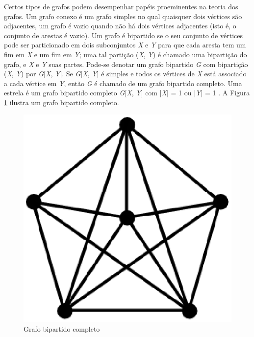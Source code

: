 Certos tipos de grafos podem desempenhar papéis proeminentes na teoria dos grafos. Um grafo conexo é um grafo simples no qual quaisquer dois vértices são adjacentes, um grafo é vazio quando não há dois vértices adjacentes (isto é, o conjunto de arestas é vazio). Um grafo é bipartido se o seu conjunto de vértices pode ser particionado em dois subconjuntos \textit{X} e \textit{Y} para que cada aresta tem um fim em \textit{X} e um fim em \textit{Y}; uma tal partição (\textit{X}, \textit{Y}) é chamado uma bipartição do grafo, e \textit{X} e \textit{Y} suas partes. Pode-se denotar um grafo bipartido \textit{G} com bipartição (\textit{X}, \textit{Y}) por \textit{G}[\textit{X}, \textit{Y}]. Se \textit{G}[\textit{X}, \textit{Y}] é simples e todos os vértices de \textit{X} está associado a cada vértice em \textit{Y}, então \textit{G} é chamado de um grafo bipartido completo. Uma estrela é um grafo bipartido completo \textit{G}[\textit{X}, \textit{Y}] com |\textit{X}| = 1 ou |\textit{Y}| = 1 \cite{Diestel:1997}.  A Figura \ref{bipartido_completo} ilustra um grafo bipartido completo.

\begin{figure}[!h]
	\centering
	\includegraphics[scale=0.5]{figuras/capitulo2/bipartido_completo.eps}
	\caption{Grafo bipartido completo}
	\label{bipartido_completo}
\end{figure}

